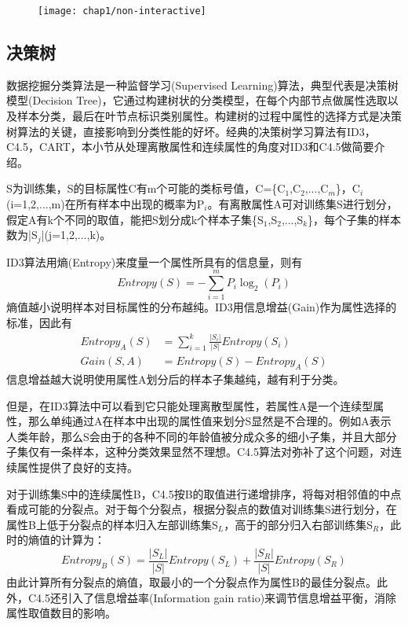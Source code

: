 \begin{figure}[!htp]
	\centering
	\texttt{[image: chap1/non-interactive]}
\end{figure}


\subsection{决策树} %

数据挖掘分类算法是一种监督学习(Supervised Learning)算法，典型代表是决策树模型(Decision Tree)\cite{decision tree}，它通过构建树状的分类模型，在每个内部节点做属性选取以及样本分类，最后在叶节点标识类别属性。构建树的过程中属性的选择方式是决策树算法的关键，直接影响到分类性能的好坏。经典的决策树学习算法有ID3\cite{decision tree}，C4.5\cite{c45}，CART\cite{cart}，本小节从处理离散属性和连续属性的角度对ID3和C4.5做简要介绍。

\begin{exmp}
	S为训练集，S的目标属性C有m个可能的类标号值，C=\{C$_{1}$,C$_{2}$,...,C$_{m}$\}，C$_{i}$(i=1,2,...,m)在所有样本中出现的概率为P$_{i}$。有离散属性A可对训练集S进行划分，假定A有k个不同的取值，能把S划分成k个样本子集\{S$_{1}$,S$_{2}$,...,S$_{k}$\}，每个子集的样本数为|S$_{j}$|(j=1,2,...,k)。
\end{exmp}
ID3算法用熵(Entropy)来度量一个属性所具有的信息量，则有
\[
	Entropy(S) = -\sum_{i=1}^{m}P_{i}\log_{2}(P_{i})
\]
熵值越小说明样本对目标属性的分布越纯。ID3用信息增益(Gain)作为属性选择的标准，因此有
\[
\begin{split}
	Entropy_{A}(S) &= \sum_{i=1}^{k}\frac{|S_{i}|}{|S|}Entropy(S_{i})\\
	Gain(S,A) &= Entropy(S)-Entropy_{A}(S)
\end{split}
\]
信息增益越大说明使用属性A划分后的样本子集越纯，越有利于分类。

但是，在ID3算法中可以看到它只能处理离散型属性，若属性A是一个连续型属性，那么单纯通过A在样本中出现的属性值来划分S显然是不合理的。例如A表示人类年龄，那么S会由于的各种不同的年龄值被分成众多的细小子集，并且大部分子集仅有一条样本，这种分类效果显然不理想。C4.5算法对弥补了这个问题，对连续属性提供了良好的支持。

对于训练集S中的连续属性B，C4.5按B的取值进行递增排序，将每对相邻值的中点看成可能的分裂点。对于每个分裂点，根据分裂点的数值对训练集S进行划分，在属性B上低于分裂点的样本归入左部训练集S$_{L}$，高于的部分归入右部训练集S$_{R}$，此时的熵值的计算为：
\[
	Entropy_{B}(S) = \frac{|S_{L}|}{|S|}Entropy(S_{L})+\frac{|S_{R}|}{|S|}Entropy(S_{R})
\]
由此计算所有分裂点的熵值，取最小的一个分裂点作为属性B的最佳分裂点。此外，C4.5还引入了信息增益率(Information gain ratio)来调节信息增益平衡，消除属性取值数目的影响。


